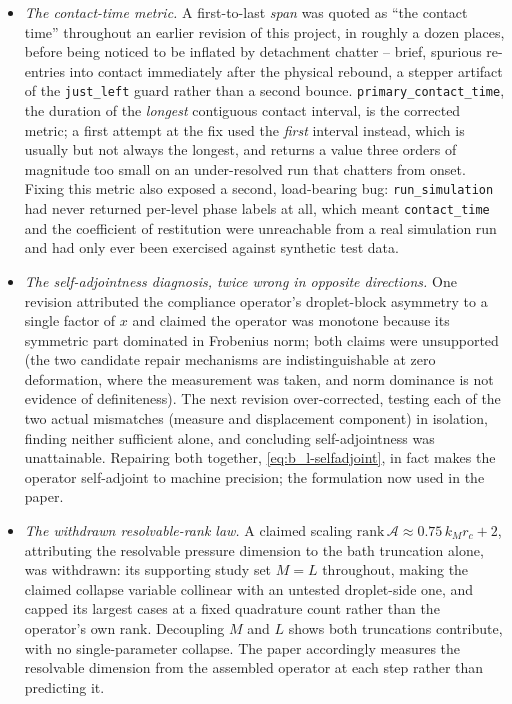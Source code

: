 \begin{itemize}
\item \emph{The contact-time metric.} A first-to-last \emph{span} was quoted as ``the contact time'' throughout an earlier revision of this project, in roughly a dozen places, before being noticed to be inflated by detachment chatter -- brief, spurious re-entries into contact immediately after the physical rebound, a stepper artifact of the \texttt{just\_left} guard rather than a second bounce. \texttt{primary\_contact\_time}, the duration of the \emph{longest} contiguous contact interval, is the corrected metric; a first attempt at the fix used the \emph{first} interval instead, which is usually but not always the longest, and returns a value three orders of magnitude too small on an under-resolved run that chatters from onset. Fixing this metric also exposed a second, load-bearing bug: \texttt{run\_simulation} had never returned per-level phase labels at all, which meant \texttt{contact\_time} and the coefficient of restitution were unreachable from a real simulation run and had only ever been exercised against synthetic test data.
\item \emph{The self-adjointness diagnosis, twice wrong in opposite directions.} One revision attributed the compliance operator's droplet-block asymmetry to a single factor of $x$ and claimed the operator was monotone because its symmetric part dominated in Frobenius norm; both claims were unsupported (the two candidate repair mechanisms are indistinguishable at zero deformation, where the measurement was taken, and norm dominance is not evidence of definiteness). The next revision over-corrected, testing each of the two actual mismatches (measure and displacement component) in isolation, finding neither sufficient alone, and concluding self-adjointness was unattainable. Repairing both together, \eqref{eq:b_l-selfadjoint}, in fact makes the operator self-adjoint to machine precision; the formulation now used in the paper.
\item \emph{The withdrawn resolvable-rank law.} A claimed scaling $\mathrm{rank}\,\mathcal A\approx0.75\,k_Mr_c+2$, attributing the resolvable pressure dimension to the bath truncation alone, was withdrawn: its supporting study set $M=L$ throughout, making the claimed collapse variable collinear with an untested droplet-side one, and capped its largest cases at a fixed quadrature count rather than the operator's own rank. Decoupling $M$ and $L$ shows both truncations contribute, with no single-parameter collapse. The paper accordingly measures the resolvable dimension from the assembled operator at each step rather than predicting it.

\end{itemize}
